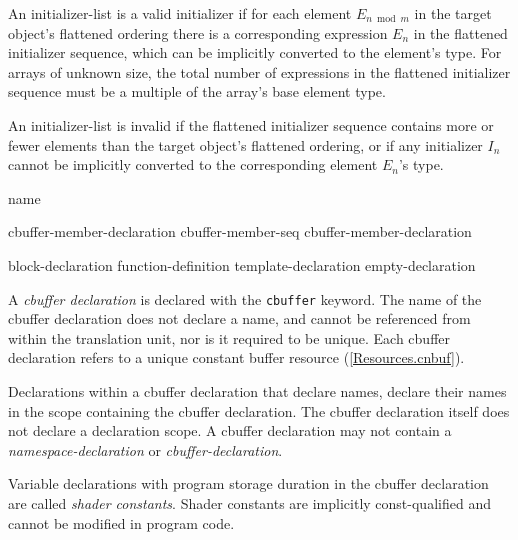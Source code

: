 \p An initializer-list is a valid initializer if for each element
\(E_{n \bmod m}\) in the target object's flattened ordering there is a
corresponding expression \(E_n\) in the flattened initializer sequence, which
can be implicitly converted to the element's type. For arrays of unknown size,
the total number of expressions in the flattened initializer sequence must be a
multiple of the array's base element type.

\p An initializer-list is invalid if the flattened initializer sequence contains
more or fewer elements than the target object's flattened ordering, or if any
initializer \(I_n\) cannot be implicitly converted to the corresponding element
\(E_n\)'s type.


\begin{grammar}
  \br
   name  \terminal{\{}
     \terminal {\}}\br

  \br
  cbuffer-member-declaration\br
  cbuffer-member-seq cbuffer-member-declaration\br

  \br
  block-declaration\br
  function-definition\br
  template-declaration\br
  empty-declaration
\end{grammar}

\p A \textit{cbuffer declaration} is declared with the \texttt{cbuffer} keyword.
The name of the cbuffer declaration does not declare a name, and cannot be
referenced from within the translation unit, nor is it required to be unique.
Each cbuffer declaration refers to a unique constant buffer resource
(\ref{Resources.cnbuf}).

\p Declarations within a cbuffer declaration that declare names, declare their
names in the scope containing the cbuffer declaration. The cbuffer declaration
itself does not declare a declaration scope. A cbuffer declaration may not
contain a \textit{namespace-declaration} or \textit{cbuffer-declaration}.

\p Variable declarations with program storage duration in the cbuffer
declaration are called \textit{shader constants}. Shader constants are implicitly
const-qualified and cannot be modified in program code.
